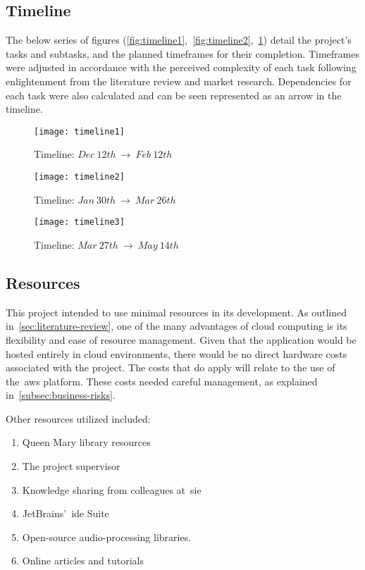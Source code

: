\subsection{Timeline}\label{subsec:timeline}

The below series of figures (\ref{fig:timeline1},~\ref{fig:timeline2},~\ref{fig:timeline3}) detail the project's tasks and subtasks, and the planned timeframes for their completion.
Timeframes were adjusted in accordance with the perceived complexity of each task following enlightenment from the literature review and market research.
Dependencies for each task were also calculated and can be seen represented as an arrow in the timeline.

\begin{figure}[!htb]
    \minipage{\textwidth}
    \texttt{[image: timeline1]}
    \caption{Timeline: $Dec~12th~\rightarrow~Feb~12th$}\label{fig:timeline1}
    \endminipage\hfill
    \minipage{\textwidth}
    \texttt{[image: timeline2]}
    \caption{Timeline: $Jan~30th~\rightarrow~Mar~26th$}\label{fig:timeline2}
    \endminipage\hfill
    \minipage{\textwidth}
    \texttt{[image: timeline3]}
    \caption{Timeline: $Mar~27th~\rightarrow~May~14th$}\label{fig:timeline3}
    \endminipage
\end{figure}

\subsection{Resources}\label{subsec:resources}

This project intended to use minimal resources in its development.
As outlined in~\ref{sec:literature-review}, one of the many advantages of cloud computing is its flexibility and ease of resource management.
Given that the application would be hosted entirely in cloud environments, there would be no direct hardware costs associated with the project.
The costs that do apply will relate to the use of the~\gls{aws} platform.
These costs needed careful management, as explained in~\ref{subsec:business-risks}.

Other resources utilized included:

\begin{enumerate}
    \item Queen Mary library resources
    \item The project supervisor
    \item Knowledge sharing from colleagues at~\gls{sie}
    \item JetBrains’~\gls{ide} Suite
    \item Open-source audio-processing libraries.
    \item Online articles and tutorials
\end{enumerate}

